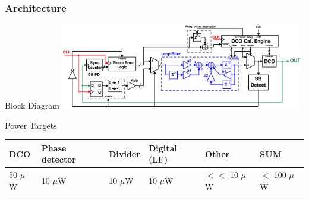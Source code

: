 \documentclass[t, screen, aspectratio=43]{beamer}
\begin{document}
\begin{frame}
	\frametitle{Architecture}
	\begin{block}{Block Diagram}
	\center\includegraphics[width=0.8\textwidth, angle=0]{pll_master_arch.pdf}

	\end{block}
		\begin{block}{Power Targets}
		\vspace{-.1em}
		\begin{table}[htb!]
			\tiny
			\centering
			\def\arraystretch{1.5}		
			\setlength\arrayrulewidth{0.75pt}
			\setlength{\tabcolsep}{1em} %
			\begin{tabular}{|l|l|l|l|l|l|}
				\hline 
				\rule[-1ex]{0pt}{2.5ex} \cellcolor{gray!40}\textbf{DCO} & \cellcolor{gray!40}\textbf{Phase detector} & \cellcolor{gray!40}\textbf{Divider }& \cellcolor{gray!40}\textbf{Digital (LF)}& \cellcolor{gray!40}\textbf{Other} & \cellcolor{gray!40}\textbf{SUM} \\ 
				\hline 
				\rule[-1ex]{0pt}{2.5ex} 50 $\mu$W& 10 $\mu$W & 10 $\mu$W & 10 $\mu$W  & $<<$ 10 $\mu$W & $<$ 100 $\mu$W\\ 
				\hline 
			\end{tabular} 
		\end{table}   
	\end{block}

\end{frame}

\end{document}
